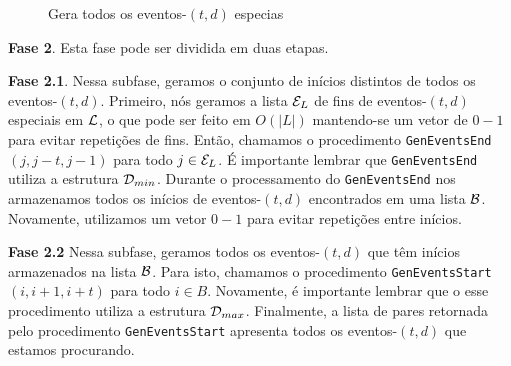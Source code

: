 \documentclass[12pt]{article}
\begin{document}
\begin{figure}

\caption{Gera todos os eventos-$(t,d)$ especias}
\label{prelista}
\end{figure}

\textbf{Fase 2}. Esta fase pode ser dividida em duas etapas.

\textbf{Fase 2.1}. Nessa subfase, geramos o conjunto de inícios distintos de todos os eventos-$(t,d)$.
Primeiro, nós geramos a lista ${\cal E}_L$ de fins de eventos-$(t,d)$ especiais em ${\cal L}$, o que
pode ser feito em $O(|L|)$ mantendo-se um vetor de $0-1$ para evitar repetições de fins. Então,
chamamos o procedimento {\tt GenEventsEnd}$(j, j - t, j - 1)$ para todo $j \in {\cal E}_L$. É 
importante lembrar que {\tt GenEventsEnd} utiliza a estrutura ${\cal D}_{min}$. Durante o processamento
do {\tt GenEventsEnd} nos armazenamos todos os inícios de eventos-$(t,d)$ encontrados em uma lista
${\cal B}$. Novamente, utilizamos um vetor $0-1$ para evitar repetições entre inícios.

\textbf{Fase 2.2} Nessa subfase, geramos todos os eventos-$(t,d)$ que têm inícios armazenados
na lista ${\cal B}$. Para isto, chamamos o procedimento {\tt GenEventsStart}$(i, i + 1, i + t)$ para
todo $i \in B$. Novamente, é importante lembrar que o esse procedimento utiliza a estrutura ${\cal D}_{max}$.
Finalmente, a lista de pares retornada pelo procedimento {\tt GenEventsStart} apresenta todos os eventos-$(t,d)$ que estamos procurando.
\end{document}
